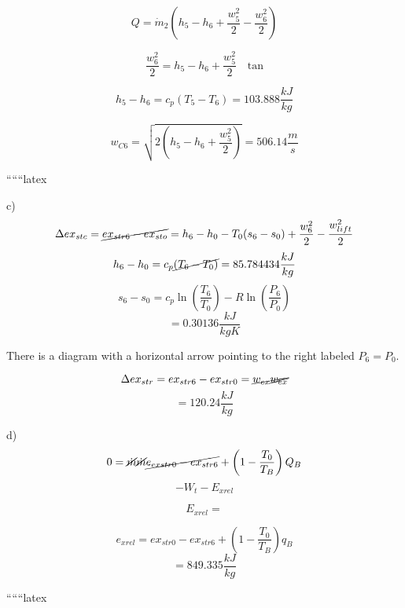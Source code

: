\[
Q = \dot{m}_2 \left( h_5 - h_6 + \frac{w_5^2}{2} - \frac{w_6^2}{2} \right)
\]

\[
\frac{w_6^2}{2} = h_5 - h_6 + \frac{w_5^2}{2} \quad \text{tan}
\]

\[
h_5 - h_6 = c_p \left( T_5 - T_6 \right) = 103.888 \frac{kJ}{kg}
\]

\[
w_{C6} = \sqrt{2 \left( h_5 - h_6 + \frac{w_5^2}{2} \right)} = 506.14 \frac{m}{s}
\]

``````latex


c)
\[
\Delta ex_{stc} = \cancel{ex_{str6} - ex_{sto}} = h_6 - h_0 - T_0(s_6 - s_0) + \frac{w_6^2}{2} - \frac{w_{lift}^2}{2}
\]
\[
h_6 - h_0 = c_p \cancel{(T_6 - T_0)} = 85.784434 \frac{kJ}{kg}
\]
\[
s_6 - s_0 = c_p \ln \left( \frac{T_6}{T_0} \right) - R \ln \left( \frac{P_6}{P_0} \right)
\]
\[
= 0.30136 \frac{kJ}{kgK}
\]

There is a diagram with a horizontal arrow pointing to the right labeled \( P_6 = P_0 \).

\[
\Delta ex_{str} = ex_{str6} - ex_{str0} = \cancel{w_{ex} \cancel{w_{ex}}}
\]
\[
= 120.24 \frac{kJ}{kg}
\]

d)
\[
0 = \cancel{\dot{m}} \cancel{\dot{m}} \cancel{e_{exstr0} - ex_{str6}} + \left( 1 - \frac{T_0}{T_B} \right) Q_B
\]
\[
- W_t - E_{xrel}
\]

\[
E_{xrel} = 
\]

\[
e_{xrel} = ex_{str0} - ex_{str6} + \left( 1 - \frac{T_0}{T_B} \right) q_B
\]
\[
= 849.335 \frac{kJ}{kg}
\]

``````latex


